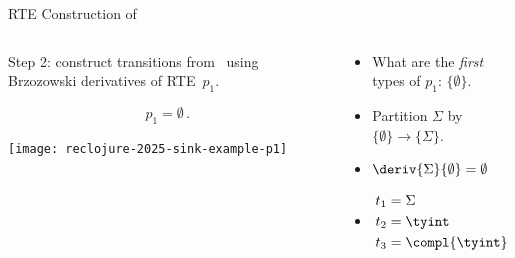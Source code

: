 \begin{frame}{RTE Construction of }
  \begin{columns}
    \begin{column}{0.45\textwidth}
      Step 2: construct transitions from~ using Brzozowski derivatives of RTE~$p_1$.

      \[p_1=\emptyset\,.\]

      \texttt{[image: reclojure-2025-sink-example-p1]}
    \end{column}
    \begin{column}{0.55\textwidth}
      \begin{itemize}
      \item<1->{What are the \emph{first} types of $p_1$: $\{\emptyset\}$.}
      \item<2->{Partition $\Sigma$ by $\{\emptyset\} \to \{\Sigma\}$.}
      \item<3->{$\deriv{\Sigma}{\emptyset} = \emptyset$}
      \item<4->{      \begin{align*}
        t_1 &= \Sigma\\
        t_2 &= \tyint  \\
        t_3 &= \compl{\tyint}
      \end{align*}}
      \end{itemize}
    \end{column}
  \end{columns}
\end{frame}



